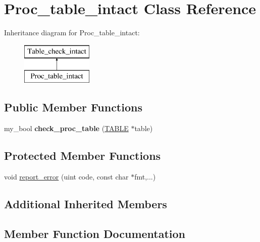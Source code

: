\hypertarget{classProc__table__intact}{}\section{Proc\+\_\+table\+\_\+intact Class Reference}
\label{classProc__table__intact}
Inheritance diagram for Proc\+\_\+table\+\_\+intact\+:\begin{figure}[H]
\begin{center}
\leavevmode
\includegraphics[height=2.000000cm]{classProc__table__intact}
\end{center}
\end{figure}
\subsection*{Public Member Functions}
\begin{DoxyCompactItemize}
\item 
\mbox{\label{classProc__table__intact_a3f135ab82d0d695e8fc21af97dcf3430}} 
my\+\_\+bool {\bfseries check\+\_\+proc\+\_\+table} (\mbox{\hyperlink{structTABLE}{T\+A\+B\+LE}} $\ast$table)
\end{DoxyCompactItemize}
\subsection*{Protected Member Functions}
\begin{DoxyCompactItemize}
\item 
void \mbox{\hyperlink{classProc__table__intact_a49f5fdcebec8f434e0a253749db738c0}{report\+\_\+error}} (uint code, const char $\ast$fmt,...)
\end{DoxyCompactItemize}
\subsection*{Additional Inherited Members}


\subsection{Member Function Documentation}
\mbox{\label{classProc__table__intact_a49f5fdcebec8f434e0a253749db738c0}} 

